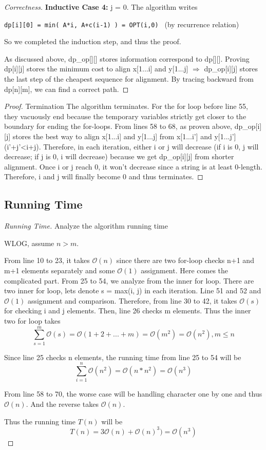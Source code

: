 \documentclass[openany]{article}
\begin{document}
\begin{proof}[Correctness]{}
     \textbf{Inductive Case 4:} j = 0. The algorithm writes 
    \begin{center}
        \texttt{dp[i][0] = min( A*i, A+c(i-1) ) = OPT(i,0) } (by recurrence relation)
    \end{center}
    
    So we completed the induction step, and thus the proof.
    
    As discussed above, dp\_op[][] stores information correspond to dp[][]. Proving dp[i][j] stores the minimum cost to align x[1...i] and y[1...j] $\Rightarrow$ dp\_op[i][j] stores the last step of the cheapest sequence for alignment. By tracing backward from dp[n][m], we can find a correct path.
    
\end{proof}
\begin{proof}{Termination}
        The algorithm terminates. For the for loop before line 55, they vacuously end because the temporary variables strictly get closer to the boundary for ending the for-loops. From lines 58 to 68, as proven above, dp\_op[i][j] stores the best way to align x[1...i] and y[1...j] from x[1...i'] and y[1...j'] (i'+j'<i+j). Therefore, in each iteration, either i or j will decrease (if i is 0, j will decrease; if j is 0, i will decrease) because we get dp\_op[i][j] from shorter alignment. Once i or j reach 0, it won't decrease since a string is at least 0-length. Therefore, i and j will finally become 0 and thus terminates.
\end{proof}

\subsection*{Running Time}
\begin{proof}[Running Time]{Analyze the algorithm running time}
    	\renewcommand{\qedsymbol}{}
    	
    	WLOG, assume $n > m$.
    	
    	From line 10 to 23, it takes $\mathcal{O}(n)$ since there are two for-loop checks n+1 and m+1 elements separately and some $\mathcal{O}(1)$ assignment. Here comes the complicated part. From 25 to 54, we analyze from the inner for loop. There are two inner for loop, lets denote s = max(i, j) in each iteration. Line 51 and 52 and $\mathcal{O}(1)$ assignment and comparison. Therefore, from line 30 to 42, it takes $\mathcal{O}(s)$ for checking i and j elements. Then, line 26 checks m elements. Thus the inner two for loop takes
    	\[\sum_{s=1}^{m}\mathcal{O}(s) = \mathcal{O}(1+2+...+m) = \mathcal{O}(m^2) = \mathcal{O}(n^2), m\leq n\]
    	
    	Since line 25 checks n elements, the running time from line 25 to 54 will be \[\sum_{i=1}^{n}\mathcal{O}(n^2) = \mathcal{O}(n*n^2)=\mathcal{O}(n^3)\]
    	
    	From line 58 to 70, the worse case will be handling character one by one and thus $\mathcal{O}(n)$. And the reverse takes $\mathcal{O}(n)$.
    	
    	Thus the running time $T(n)$ will be \[T(n)=3\mathcal{O}(n)+\mathcal{O}(n)^3)=\mathcal{O}(n^3)\]
\end{proof}
\end{document}

